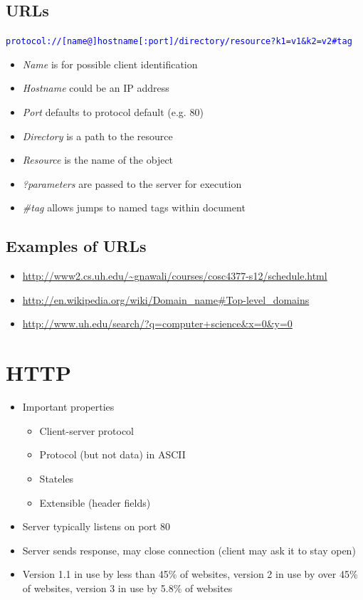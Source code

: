\subsection{URLs}
\textcolor{blue}{\texttt{protocol://[name@]hostname[:port]/directory/resource?k1=v1\&k2=v2\#tag}}
\begin{itemize}[nosep]
    \item \emph{Name} is for possible client identification
    \item \emph{Hostname} could be an IP address
    \item \emph{Port} defaults to protocol default (e.g. 80)
    \item \emph{Directory} is a path to the resource
    \item \emph{Resource} is the name of the object
    \item \emph{?parameters} are passed to the server for execution
    \item \emph{\#tag} allows jumps to named tags within document
\end{itemize}
\subsection{Examples of URLs}
\begin{itemize}[nosep]
    \item \url{http://www2.cs.uh.edu/~gnawali/courses/cosc4377-s12/schedule.html}
    \item \url{http://en.wikipedia.org/wiki/Domain_name#Top-level_domains}
    \item \url{http://www.uh.edu/search/?q=computer+science&x=0&y=0}
\end{itemize}
\section{HTTP}
\begin{itemize}[nosep]
    \item Important properties
          \begin{itemize}[nosep]
              \item Client-server protocol
              \item Protocol (but not data) in ASCII
              \item Stateles
              \item Extensible (header fields)
          \end{itemize}
    \item Server typically listens on port 80
    \item Server sends response, may close connection (client may ask it to stay open)
    \item Version 1.1 in use by less than 45\% of websites, version 2 in use by over 45\% of websites, version 3 in use by 5.8\% of websites
\end{itemize}

